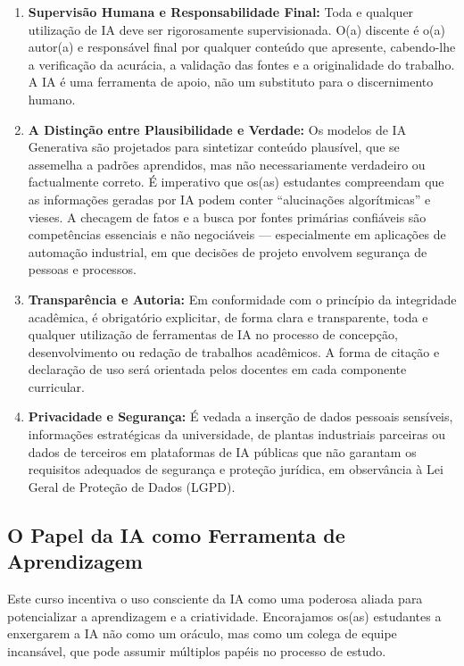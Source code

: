 \begin{enumerate}
    \item \textbf{Supervisão Humana e Responsabilidade Final:} Toda e qualquer utilização de IA deve ser rigorosamente supervisionada. O(a) discente é o(a) autor(a) e responsável final por qualquer conteúdo que apresente, cabendo-lhe a verificação da acurácia, a validação das fontes e a originalidade do trabalho. A IA é uma ferramenta de apoio, não um substituto para o discernimento humano.

    \item \textbf{A Distinção entre Plausibilidade e Verdade:} Os modelos de IA Generativa são projetados para sintetizar conteúdo plausível, que se assemelha a padrões aprendidos, mas não necessariamente verdadeiro ou factualmente correto. É imperativo que os(as) estudantes compreendam que as informações geradas por IA podem conter ``alucinações algorítmicas'' e vieses. A checagem de fatos e a busca por fontes primárias confiáveis são competências essenciais e não negociáveis — especialmente em aplicações de automação industrial, em que decisões de projeto envolvem segurança de pessoas e processos.

    \item \textbf{Transparência e Autoria:} Em conformidade com o princípio da integridade acadêmica, é obrigatório explicitar, de forma clara e transparente, toda e qualquer utilização de ferramentas de IA no processo de concepção, desenvolvimento ou redação de trabalhos acadêmicos. A forma de citação e declaração de uso será orientada pelos docentes em cada componente curricular.

    \item \textbf{Privacidade e Segurança:} É vedada a inserção de dados pessoais sensíveis, informações estratégicas da universidade, de plantas industriais parceiras ou dados de terceiros em plataformas de IA públicas que não garantam os requisitos adequados de segurança e proteção jurídica, em observância à Lei Geral de Proteção de Dados (LGPD).
\end{enumerate}

\subsection{O Papel da IA como Ferramenta de Aprendizagem}

Este curso incentiva o uso consciente da IA como uma poderosa aliada para potencializar a aprendizagem e a criatividade. Encorajamos os(as) estudantes a enxergarem a IA não como um oráculo, mas como um colega de equipe incansável, que pode assumir múltiplos papéis no processo de estudo.

